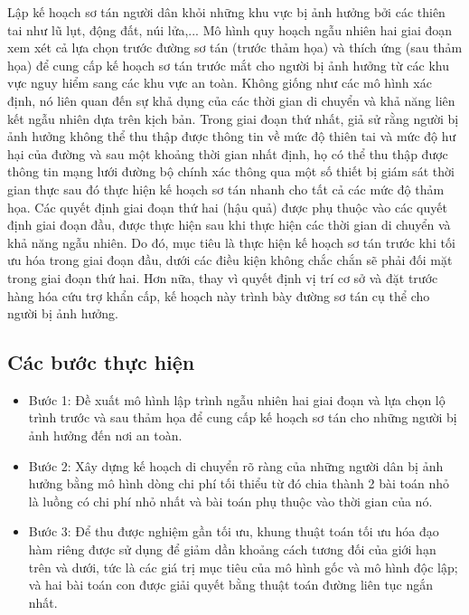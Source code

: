 \documentclass[a4paper]{article}
\begin{document}
    Lập kế hoạch sơ tán người dân khỏi những khu vực bị ảnh hưởng bởi các thiên tai như lũ lụt, động đất, núi lửa,...
    Mô hình quy hoạch ngẫu nhiên hai giai đoạn xem xét cả lựa chọn trước đường sơ tán (trước thảm họa) và thích ứng (sau thảm họa) để cung cấp kế hoạch sơ tán trước mắt cho người bị ảnh hưởng từ các khu vực nguy hiểm sang các khu vực an toàn.
    Không giống như các mô hình xác định, nó liên quan đến sự khả dụng của các thời gian di chuyển và khả năng liên kết ngẫu nhiên dựa trên kịch bản.
    Trong giai đoạn thứ nhất, giả sử rằng người bị ảnh hưởng không thể thu thập được thông tin về mức độ thiên tai và mức độ hư hại của đường và sau một khoảng thời gian nhất định, họ có thể thu thập được thông tin mạng lưới đường bộ chính xác thông qua một số thiết bị giám sát thời gian thực sau đó thực hiện kế hoạch sơ tán nhanh cho tất cả các mức độ thảm họa.
    Các quyết định giai đoạn thứ hai (hậu quả) được phụ thuộc vào các quyết định giai đoạn đầu, được thực hiện sau khi thực hiện các thời gian di chuyển và khả năng ngẫu nhiên.
    Do đó, mục tiêu là thực hiện kế hoạch sơ tán trước khi tối ưu hóa trong giai đoạn đầu, dưới các điều kiện không chắc chắn sẽ phải đối mặt trong giai đoạn thứ hai.
    Hơn nữa, thay vì quyết định vị trí cơ sở và đặt trước hàng hóa cứu trợ khẩn cấp, kế hoạch này trình bày đường sơ tán cụ thể cho người bị ảnh hưởng. 

    \subsection{Các bước thực hiện}

    \begin{itemize}
        \item Bước 1: Đề xuất mô hình lập trình ngẫu nhiên hai giai đoạn và lựa chọn lộ trình trước và sau thảm họa để cung cấp kế hoạch sơ tán cho những người bị ảnh hưởng đến nơi an toàn.
        \item Bước 2: Xây dựng kế hoạch di chuyển rõ ràng của những người dân bị ảnh hưởng bằng mô hình dòng chi phí tối thiểu từ đó chia thành 2 bài toán nhỏ là luồng có chi phí nhỏ nhất và bài toán phụ thuộc vào thời gian của nó.
        \item Bước 3: Để thu được nghiệm gần tối ưu, khung thuật toán tối ưu hóa đạo hàm riêng được sử dụng để giảm dần khoảng cách tương đối của giới hạn trên và dưới, tức là các giá trị mục tiêu của mô hình gốc và mô hình độc lập; và hai bài toán con được giải quyết bằng thuật toán đường liên tục ngắn nhất. 
    \end{itemize}
\end{document}
